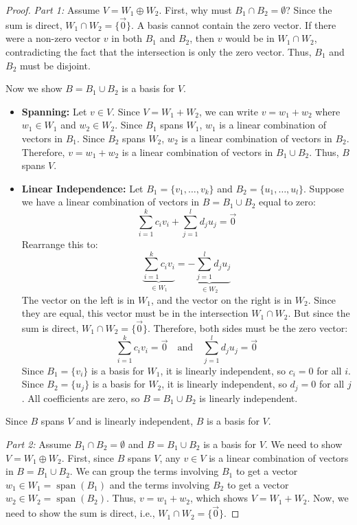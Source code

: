 \documentclass[11pt]{article}
\theoremstyle{definition}
\theoremstyle{remark}
\newcommand{\spanv}{\operatorname{span}}
\newcommand{\intersect}{\cap}
\newcommand{\union}{\cup}
\newcommand{\directsum}{\oplus}
\newcommand{\emptysetset}{\emptyset}
\begin{document}
\begin{proof}
\textit{Part 1:} Assume $V = W_1 \directsum W_2$.
First, why must $B_1 \intersect B_2 = \emptysetset$? Since the sum is direct, $W_1 \intersect W_2 = \{\vec{0}\}$. A basis cannot contain the zero vector. If there were a non-zero vector $v$ in both $B_1$ and $B_2$, then $v$ would be in $W_1 \intersect W_2$, contradicting the fact that the intersection is only the zero vector. Thus, $B_1$ and $B_2$ must be disjoint.

Now we show $B = B_1 \union B_2$ is a basis for $V$.
\begin{itemize}
    \item \textbf{Spanning:} Let $v \in V$. Since $V=W_1+W_2$, we can write $v=w_1+w_2$ where $w_1 \in W_1$ and $w_2 \in W_2$. Since $B_1$ spans $W_1$, $w_1$ is a linear combination of vectors in $B_1$. Since $B_2$ spans $W_2$, $w_2$ is a linear combination of vectors in $B_2$. Therefore, $v = w_1+w_2$ is a linear combination of vectors in $B_1 \union B_2$. Thus, $B$ spans $V$.
    \item \textbf{Linear Independence:} Let $B_1 = \{v_1, \dots, v_k\}$ and $B_2 = \{u_1, \dots, u_l\}$. Suppose we have a linear combination of vectors in $B = B_1 \union B_2$ equal to zero:
    \[ \sum_{i=1}^k c_i v_i + \sum_{j=1}^l d_j u_j = \vec{0} \]
    Rearrange this to:
    \[ \underbrace{\sum_{i=1}^k c_i v_i}_{\in W_1} = \underbrace{- \sum_{j=1}^l d_j u_j}_{\in W_2} \]
    The vector on the left is in $W_1$, and the vector on the right is in $W_2$. Since they are equal, this vector must be in the intersection $W_1 \intersect W_2$. But since the sum is direct, $W_1 \intersect W_2 = \{\vec{0}\}$. Therefore, both sides must be the zero vector:
    \[ \sum_{i=1}^k c_i v_i = \vec{0} \quad \text{and} \quad \sum_{j=1}^l d_j u_j = \vec{0} \]
    Since $B_1=\{v_i\}$ is a basis for $W_1$, it is linearly independent, so $c_i=0$ for all $i$.
    Since $B_2=\{u_j\}$ is a basis for $W_2$, it is linearly independent, so $d_j=0$ for all $j$.
    All coefficients are zero, so $B = B_1 \union B_2$ is linearly independent.
\end{itemize}
Since $B$ spans $V$ and is linearly independent, $B$ is a basis for $V$.

\textit{Part 2:} Assume $B_1 \intersect B_2 = \emptysetset$ and $B = B_1 \union B_2$ is a basis for $V$. We need to show $V = W_1 \directsum W_2$.
First, since $B$ spans $V$, any $v \in V$ is a linear combination of vectors in $B = B_1 \union B_2$. We can group the terms involving $B_1$ to get a vector $w_1 \in W_1 = \spanv(B_1)$ and the terms involving $B_2$ to get a vector $w_2 \in W_2 = \spanv(B_2)$. Thus, $v = w_1 + w_2$, which shows $V = W_1 + W_2$.
Now, we need to show the sum is direct, i.e., $W_1 \intersect W_2 = \{\vec{0}\}$.


\end{proof}
\end{document}
